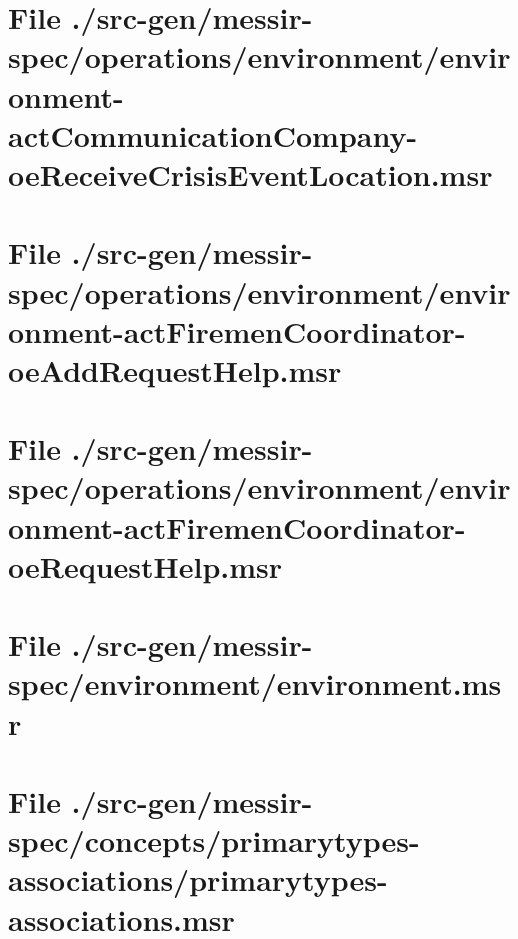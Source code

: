 \section[File /.../environment-actCommunicationCompany-oeReceiveCrisisEventLocation.msr]{File ./src-gen/messir-spec/operations/environment/environment-actCommunicationCompany-oeReceiveCrisisEventLocation.msr}
\scriptsize

\normalsize
	
\section[File /src-gen.../environment-actFiremenCoordinator-oeAddRequestHelp.msr]{File ./src-gen/messir-spec/operations/environment/environment-actFiremenCoordinator-oeAddRequestHelp.msr}
\scriptsize

\normalsize
	
\section[File /src-gen.../environment-actFiremenCoordinator-oeRequestHelp.msr]{File ./src-gen/messir-spec/operations/environment/environment-actFiremenCoordinator-oeRequestHelp.msr}
\scriptsize

\normalsize
	
\section[File /src-gen/messir-spec/environment/environment.msr]{File ./src-gen/messir-spec/environment/environment.msr}
\scriptsize

\normalsize
	
\section[File /src-gen/messir-spec/concepts.../primarytypes-associations.msr]{File ./src-gen/messir-spec/concepts/primarytypes-associations/primarytypes-associations.msr}
\scriptsize

\normalsize
	
